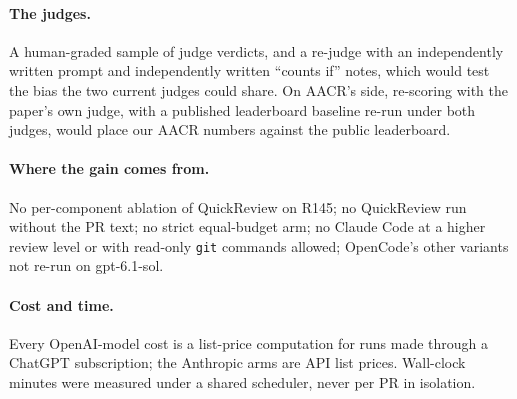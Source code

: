 \documentclass[11pt,a4paper]{article}
\newcommand{\qcr}{QuickReview}
\newcommand{\code}[1]{\texttt{#1}}
\begin{document}
\paragraph{The judges.} A human-graded sample of judge verdicts, and a re-judge with an independently written prompt and
independently written ``counts if'' notes, which would test the bias the two
current judges could share. On AACR's side, re-scoring with the paper's own
judge, with a published leaderboard baseline re-run under both judges, would
place our AACR numbers against the public leaderboard.

\paragraph{Where the gain comes from.} No per-component ablation of \qcr{} on
R145; no \qcr{} run without the PR text; no strict equal-budget arm; no
Claude Code at a higher review level or with read-only \code{git} commands
allowed; OpenCode's other variants not re-run on gpt-6.1-sol.

\paragraph{Cost and time.} Every OpenAI-model cost is a list-price
computation for runs made through a ChatGPT subscription; the Anthropic arms
are API list prices. Wall-clock minutes were measured under a shared
scheduler, never per PR in isolation.
\end{document}
